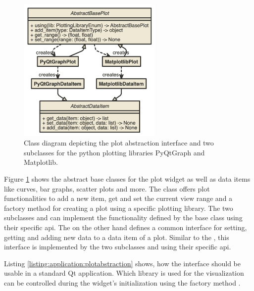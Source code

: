 \begin{figure}[h]
    \centering
    \includegraphics[width=7cm]{resources/img/class/plotabstraction}
    \caption{
        Class diagram depicting the plot abstraction interface and two
        subclasses for the python plotting libraries PyQtGraph and Matplotlib. 
    }
    \label{fig:application:design:classdiagram:plot}
\end{figure}

Figure \ref{fig:application:design:classdiagram:plot} shows the abstract base
classes for the plot widget as well as data items like curves, bar graphs,
scatter plots and more. The class  offers
plot functionalities to add a new item, get and set the current view range and a
factory method for creating a plot using a specific plotting library. The two
subclasses  and
 can implement the functionality defined by
the base class using their specific \gls{api}. The
 on the other hand defines a common
interface for setting, getting and adding new data to a data item of a plot.
Similar to the , this interface is
implemented by the two subclasses  and
 using their specific \gls{api}.

Listing \ref{listing:application:plotabstraction} shows, how the interface
should be usable in a standard Qt application. Which library is used for the
visualization can be controlled during the widget's initialization using the
 factory method
.




